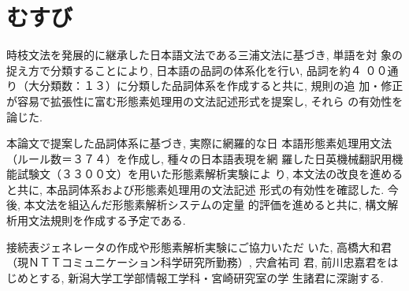 \section{むすび}
 時枝文法を発展的に継承した日本語文法である三浦文法に基づき, 単語を対
象の捉え方で分類することにより, 日本語の品詞の体系化を行い, 品詞を約４
００通り（大分類数：１３）に分類した品詞体系を作成すると共に, 規則の追
加・修正が容易で拡張性に富む形態素処理用の文法記述形式を提案し, それら
の有効性を論じた. 

 本論文で提案した品詞体系に基づき, 実際に網羅的な日
本語形態素処理用文法（ルール数＝３７４）を作成し, 種々の日本語表現を網
羅した日英機械翻訳用機能試験文（３３００文）を用いた形態素解析実験によ
り, 本文法の改良を進めると共に, 本品詞体系および形態素処理用の文法記述
形式の有効性を確認した. 今後, 本文法を組込んだ形態素解析システムの定量
的評価を進めると共に, 構文解析用文法規則を作成する予定である.

\vspace*{10mm}
\acknowledgment
接続表ジェネレータの作成や形態素解析実験にご協力いただ
いた, 高橋大和君（現ＮＴＴコミュニケーション科学研究所勤務）, 宍倉祐司
君, 前川忠嘉君をはじめとする, 新潟大学工学部情報工学科・宮崎研究室の学
生諸君に深謝する. 

